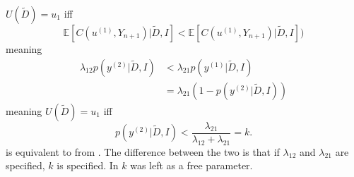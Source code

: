 \begin{example}
	$U(\tilde{D})=u_1$ iff
	\begin{equation}
		\mathbb{E}[C(u^{(1)},Y_{n+1})|\tilde{D},I]<\mathbb{E}[C(u^{(1)},Y_{n+1})|\tilde{D},I])
	\end{equation}
	meaning
	\begin{equation}
		\begin{split}
			\lambda_{12}p(y^{(2)}|\tilde{D},I)&<\lambda_{21}p(y^{(1)}|\tilde{D},I)\\
			&=\lambda_{21}(1-p(y^{(2)}|\tilde{D},I))
		\end{split}
	\end{equation}
	meaning $U(\tilde{D}) = u_1$ iff
	\begin{equation}
		p(y^{(2)}|\tilde{D},I)<\frac{\lambda_{21}}{\lambda_{12}+\lambda_{21}}=k.
		\label{eq:threshold31}
	\end{equation}
	 is equivalent to  from . The difference between the two is that if $\lambda_{12}$ and $\lambda_{21}$ are specified, $k$ is specified. In  $k$ was left as a free parameter.
\end{example}


